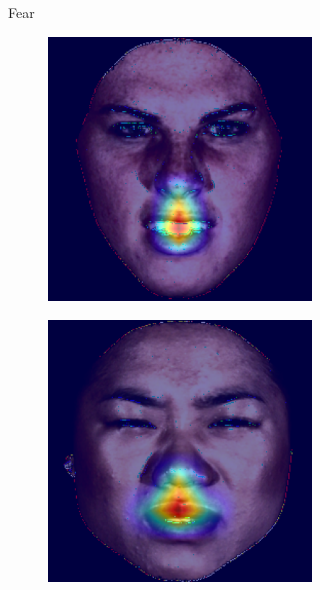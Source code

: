 \begin{figure}[ht]
\begin{subfigure}{0.45\textwidth}
\begin{subfigure}{0.45\textwidth}
        \end{subfigure}
        \caption{Fear}
    \end{subfigure}

    \begin{subfigure}{0.45\textwidth}
        \centering
        \begin{subfigure}{0.45\textwidth}
            \includegraphics[width=\linewidth]{Images/Heatmaps/heatmap_disgust_1.png}
        \end{subfigure}
        \begin{subfigure}{0.45\textwidth}
            \includegraphics[width=\linewidth]{Images/Heatmaps/heatmap_disgust_2.png}

\end{subfigure}
\end{subfigure}
\end{figure}

